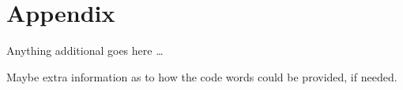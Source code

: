 \section{Appendix}
\label{sec:appendix}

Anything additional goes here \dots

Maybe extra information as to how the code words could be provided, if needed.